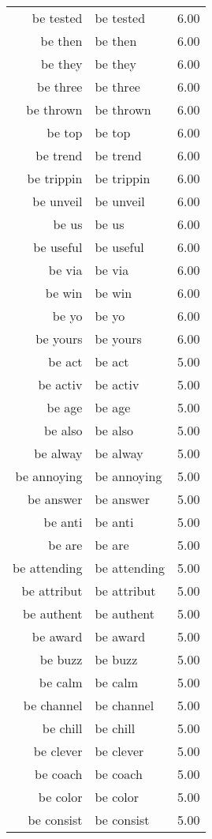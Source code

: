 \begin{table}[ht]
\begin{tabular}{rlr}
  be tested & be tested & 6.00 \\ 
  be then & be then & 6.00 \\ 
  be they & be they & 6.00 \\ 
  be three & be three & 6.00 \\ 
  be thrown & be thrown & 6.00 \\ 
  be top & be top & 6.00 \\ 
  be trend & be trend & 6.00 \\ 
  be trippin & be trippin & 6.00 \\ 
  be unveil & be unveil & 6.00 \\ 
  be us & be us & 6.00 \\ 
  be useful & be useful & 6.00 \\ 
  be via & be via & 6.00 \\ 
  be win & be win & 6.00 \\ 
  be yo & be yo & 6.00 \\ 
  be yours & be yours & 6.00 \\ 
  be act & be act & 5.00 \\ 
  be activ & be activ & 5.00 \\ 
  be age & be age & 5.00 \\ 
  be also & be also & 5.00 \\ 
  be alway & be alway & 5.00 \\ 
  be annoying & be annoying & 5.00 \\ 
  be answer & be answer & 5.00 \\ 
  be anti & be anti & 5.00 \\ 
  be are & be are & 5.00 \\ 
  be attending & be attending & 5.00 \\ 
  be attribut & be attribut & 5.00 \\ 
  be authent & be authent & 5.00 \\ 
  be award & be award & 5.00 \\ 
  be buzz & be buzz & 5.00 \\ 
  be calm & be calm & 5.00 \\ 
  be channel & be channel & 5.00 \\ 
  be chill & be chill & 5.00 \\ 
  be clever & be clever & 5.00 \\ 
  be coach & be coach & 5.00 \\ 
  be color & be color & 5.00 \\ 
  be consist & be consist & 5.00 \\ 

\end{tabular}
\end{table}
